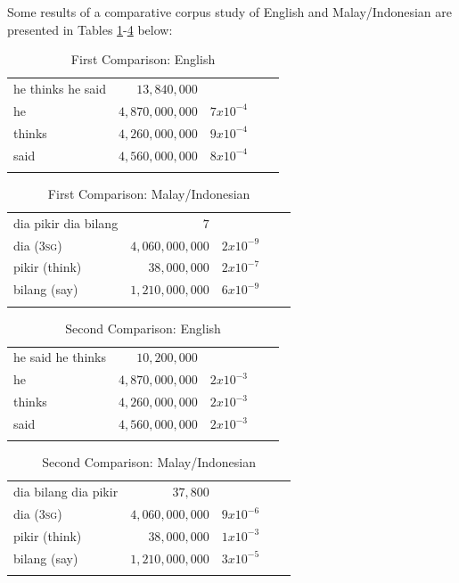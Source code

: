 \documentclass[output=paper,colorlinks,citecolor=brown
]{langscibook}
\begin{document}
Some results of a comparative corpus study of English and Malay/Indonesian are presented in Tables \ref{tab:first-english}-\ref{tab:second-malay} below:

\begin{table}
\caption{First Comparison: English}
\label{tab:first-english}
 \begin{tabularx}{.8\textwidth}{X rrrr}
 \lsptoprule
 he thinks he said & $13,840,000$ & {} \\
 he & $4,870,000,000$ & $7 x 10^{-4}$ \\
 thinks & $4,260,000,000$ & $9 x 10^{-4}$\\
 said & $4,560,000,000$ & $8 x 10^{-4}$\\
 \lspbottomrule
 \end{tabularx}
\end{table}

\begin{table}
\caption{First Comparison: Malay/Indonesian}
\label{tab:first-malay}
 \begin{tabularx}{.8\textwidth}{X rrrr}
 \lsptoprule
 dia pikir dia bilang & $7$ & {} \\
 dia (3\textsc{sg}) & $4,060,000,000$ & $2 x 10^{-9}$ \\
 pikir (think) & $38,000,000$ & $2 x 10^{-7}$\\
 bilang (say) & $1,210,000,000$ & $6 x 10^{-9}$\\
 \lspbottomrule
 \end{tabularx}
\end{table}

\begin{table}
\caption{Second Comparison: English}
\label{tab:second-english}
 \begin{tabularx}{.8\textwidth}{X rrrr}
 \lsptoprule
 he said he thinks & $10,200,000$ & {} \\
 he & $4,870,000,000$ & $2 x 10^{-3}$ \\
 thinks & $4,260,000,000$ & $2 x 10^{-3}$\\
 said & $4,560,000,000$ & $2 x 10^{-3}$\\
 \lspbottomrule
 \end{tabularx}
\end{table}

\begin{table}
\caption{Second Comparison: Malay/Indonesian}
\label{tab:second-malay}
 \begin{tabularx}{.8\textwidth}{X rrrr}
 \lsptoprule
 dia bilang dia pikir & $37,800$ & {} \\
 dia (3\textsc{sg}) & $4,060,000,000$ & $9 x 10^{-6}$ \\
 pikir (think) & $38,000,000$ & $1 x 10^{-3}$\\
 bilang (say) & $1,210,000,000$ & $3 x 10^{-5}$\\
 \lspbottomrule
 \end{tabularx}
\end{table}
\end{document}
